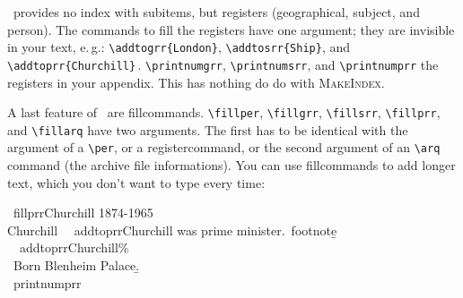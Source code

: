 \documentclass[12pt,a4paper]{article}
\newcommand{\pbs}{\string\ \unskip}
\newcommand{\bs}{\protect\pbs}
\renewcommand{\{}{{\normalfont\lbashortmem}}
\renewcommand{\}}{{\normalfont\rbashortmem}}
\begin{document}
\noindent 
\BibArts\ provides no index with sub\hy items, but registers (geographical,
subject, and person). The commands to fill the registers have one argument;
they are invisible in your text, e.\,g.: \verb|\addtogrr{London}|,
\verb|\addtosrr{Ship}|, and \verb|\addtoprr{Churchill}|\,.
\verb|\printnumgrr|, \verb|\printnumsrr|, and \verb|\printnumprr| the
registers in your appendix. This has nothing do do with \textsc{MakeIndex}.

\vspace{1ex}\noindent 
A last feature of \BibArts\ are fill\hy commands. \verb|\fillper|,
\verb|\fillgrr|, \verb|\fillsrr|, \verb|\fillprr|, and \verb|\fillarq| 
have two arguments. The first has to be identical with the argument of a
\verb|\per|\fhy, or a register\hy command, or the second argument of an
\verb|\arq| command (the archive file informations). You can use
fill\hy commands to add longer text, which you don't want to type every time:

\vspace{-.25ex}
\Doppelbox
{\vspace{1ex}
 \bs fillprr\{Churchill\} \{1874-1965\} \\[1.5ex] 
 Churchill \ \bs addtoprr\{Churchill\}
 was prime minister.\bs footnote\b{\{}
 \\ \ \bs addtoprr\{Churchill\}\%
 \\ \ Born Blenheim Palace.\b{\}} \\[1.325ex] 
 \bs printnumprr
 \vspace{1ex}
}
{\vspace{-.875ex}%
 \\[.75ex]
 \vspace{-1ex}%
}
\end{document}
